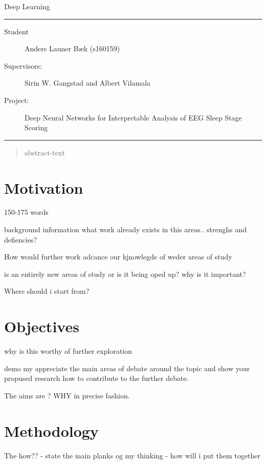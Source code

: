 \documentclass[11pt]{article}
\begin{document}
\begin{center}
{{\Large \sc Deep Learning}}
\end{center}
\rule{\textwidth}{1pt}
\begin{description}
\item[Student] Anders Launer Bæk (s160159)
\item[Supervisors:] Sirin W. Gangstad and Albert Vilamala
\item[Project:] Deep Neural Networks for Interpretable Analysis of EEG Sleep Stage Scoring
\end{description}
\rule{\textwidth}{1pt}



\begin{abstract}
   abstract-text
\end{abstract}




\section{Motivation}

150-175 words

background information
what work already  exists in this areas.. strenghs and defiencies?

How would further work adcance our kjnowlegde of weder areas of study

is an entirely new areas of study or is it being oped up?
why is it important?

Where should i start from?



\section{Objectives}

why is this worthy of further exploration

demo my appreciate the main areas of debate around the topic and show your propused research how to contribute to the further debate.

The aims are ? WHY  in precise fashion.



\section{Methodology}

The how??
- state the main planks og my thinking - how will i put them together
\end{document}
